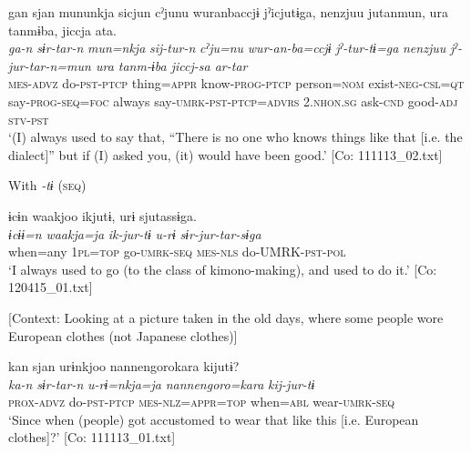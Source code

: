 \ex
{\TM}
\glll  gan  sjan  mununkja  sicjun{\footnotemark}   cˀjunu  wuranbaccjɨ  jˀicjutɨga,  {\textbar}nenzjuu{\textbar}      jutanmun,  ura  tanmɨba,  jiccja  ata.\\
\textit{ga-n}  \textit{sɨr-tar-n}  \textit{mun=nkja}  \textit{sij-tur-n}     \textit{cˀju=nu}  \textit{wur-an-ba=ccjɨ}  \textit{jˀ-tur-tɨ=ga}  \textit{nenzjuu}      \textit{jˀ-jur-tar-n=mun  ura  tanm-ɨba  jiccj-sa  ar-tar}\\
\textsc{mes}-\textsc{advz}  do-\textsc{pst}-\textsc{ptcp}  thing=\textsc{appr}  know-\textsc{prog}-\textsc{ptcp}  person=\textsc{nom}  exist-\textsc{neg}-\textsc{csl}=\textsc{qt}  say-\textsc{prog}-\textsc{seq}=\textsc{foc}  always  say-\textsc{umrk}-\textsc{pst}-\textsc{ptcp}=\textsc{advrs}  2.\textsc{nhon}.\textsc{sg}  ask-\textsc{cnd}  good-\textsc{adj}  \textsc{stv}-\textsc{pst}\\
\glt ‘(I) always used to say that, “There is no one who knows things like that [i.e. the dialect]” but if (I) asked you, (it) would have been good.’ [Co: 111113\_02.txt]

  With \textit{-tɨ} (\textsc{seq})

\ex
{\TM}
\glll  ɨcɨn  waakjoo  ikjutɨ,  urɨ  sjutassɨga.\\
\textit{ɨcɨɨ=n}  \textit{waakja=ja}  \textit{ik-jur-tɨ}  \textit{u-rɨ}  \textit{sɨr-jur-tar-sɨga}\\
when=any  1\textsc{pl}=\textsc{top}  go-\textsc{umrk}-\textsc{seq}  \textsc{mes}-\textsc{nls}  do-UMRK-\textsc{pst}-\textsc{pol}\\
\glt ‘I always used to go (to the class of kimono-making), and used to do it.’ [Co: 120415\_01.txt]

\ex {}[Context: Looking at a picture taken in the old days, where some people wore European clothes (not Japanese clothes)]

{\TM}
\glll  kan  sjan  urɨnkjoo  {\textbar}nannengoro{\textbar}kara      kijutɨ?\\
\textit{ka-n}  \textit{sɨr-tar-n}  \textit{u-rɨ=nkja=ja}  \textit{nannengoro=kara}     \textit{kij-jur-tɨ}\\
\textsc{prox}-\textsc{advz}  do-\textsc{pst}-\textsc{ptcp}  \textsc{mes}-\textsc{nlz}=\textsc{appr}=\textsc{top}  when=\textsc{abl}   wear-\textsc{umrk}-\textsc{seq}\\
\glt ‘Since when (people) got accustomed to wear that like this [i.e. European clothes]?’ [Co: 111113\_01.txt]

